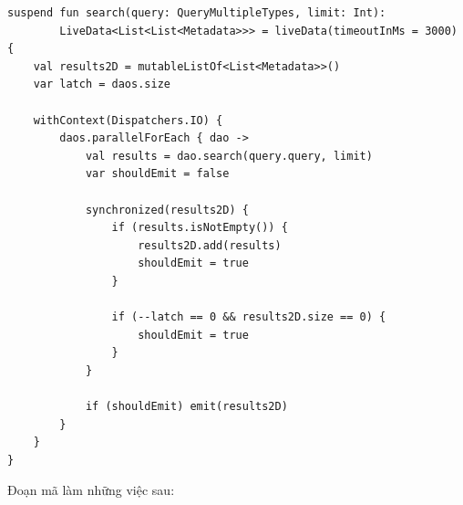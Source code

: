 \documentclass[../../thesis]{subfiles}
\begin{document}
\begin{verbatim}
suspend fun search(query: QueryMultipleTypes, limit: Int):
        LiveData<List<List<Metadata>>> = liveData(timeoutInMs = 3000) {
    val results2D = mutableListOf<List<Metadata>>()
    var latch = daos.size

    withContext(Dispatchers.IO) {
        daos.parallelForEach { dao ->
            val results = dao.search(query.query, limit)
            var shouldEmit = false

            synchronized(results2D) {
                if (results.isNotEmpty()) {
                    results2D.add(results)
                    shouldEmit = true
                }

                if (--latch == 0 && results2D.size == 0) {
                    shouldEmit = true
                }
            }

            if (shouldEmit) emit(results2D)
        }
    }
}
\end{verbatim}

Đoạn mã làm những việc sau:
\end{document}
